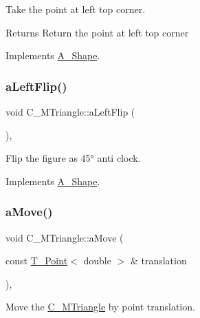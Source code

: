 Take the point at left top corner. 

\begin{DoxyReturn}{Returns}
Return the point at left top corner 
\end{DoxyReturn}


Implements \hyperlink{classA__Shape_abe6781b13037bf7ecea8ff9456b31533}{A\+\_\+\+Shape}.

\mbox{\label{classC__MTriangle_a3dcac8e1341a79139577deb851a6481e}} 
\subsubsection{\texorpdfstring{a\+Left\+Flip()}{aLeftFlip()}}
{\footnotesize\ttfamily void C\+\_\+\+M\+Triangle\+::a\+Left\+Flip (\begin{DoxyParamCaption}{ }\end{DoxyParamCaption})\hspace{0.3cm}{\ttfamily [override]}, {\ttfamily [virtual]}}



Flip the figure as 45° anti clock. 



Implements \hyperlink{classA__Shape_abe947e7003cb63be2b4f6c439533427d}{A\+\_\+\+Shape}.

\mbox{\label{classC__MTriangle_a4e185345e7e1ffd5c0b7f1f8dfdbdc59}} 
\subsubsection{\texorpdfstring{a\+Move()}{aMove()}}
{\footnotesize\ttfamily void C\+\_\+\+M\+Triangle\+::a\+Move (\begin{DoxyParamCaption}\item[{const \hyperlink{classT__Point}{T\+\_\+\+Point}$<$ double $>$ \&}]{translation }\end{DoxyParamCaption})\hspace{0.3cm}{\ttfamily [override]}, {\ttfamily [virtual]}}



Move the \hyperlink{classC__MTriangle}{C\+\_\+\+M\+Triangle} by point translation. 


